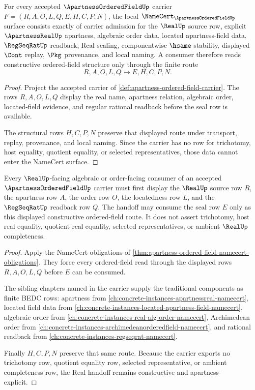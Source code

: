 \begin{theorem}
\label{thm:apartness-ordered-field-namecert-obligations}
For every accepted $\ApartnessOrderedFieldUp$ carrier $F=(R,A,O,L,Q,E,H,C,P,N)$, the local $\NameCert_{\ApartnessOrderedFieldUp}$ surface consists exactly of carrier admission for the $\RealUp$ source row, explicit $\ApartnessRealUp$ apartness, algebraic order data, located apartness-field data, $\RegSeqRatUp$ readback, Real sealing, componentwise $\hsame$ stability, displayed $\Cont$ replay, $\Pkg$ provenance, and local naming. A consumer therefore reads constructive ordered-field structure only through the finite route
$$
R,A,O,L,Q \longmapsto E,H,C,P,N .
$$
\end{theorem}
\begin{proof}
Project the accepted carrier of \autoref{def:apartness-ordered-field-carrier}. The rows $R,A,O,L,Q$ display the real name, apartness relation, algebraic order, located-field evidence, and regular rational readback before the seal row is available.

The structural rows $H,C,P,N$ preserve that displayed route under transport, replay, provenance, and local naming. Since the carrier has no row for trichotomy, host equality, quotient equality, or selected representatives, those data cannot enter the NameCert surface.
\end{proof}

\begin{theorem}
\label{thm:apartness-ordered-field-real-handoff}
Every $\RealUp$-facing algebraic or order-facing consumer of an accepted $\ApartnessOrderedFieldUp$ carrier must first display the $\RealUp$ source row $R$, the apartness row $A$, the order row $O$, the locatedness row $L$, and the $\RegSeqRatUp$ readback row $Q$. The handoff may consume the seal row $E$ only as this displayed constructive ordered-field route. It does not assert trichotomy, host real equality, quotient real equality, selected representatives, or ambient $\RealUp$ completeness.
\end{theorem}
\begin{proof}
Apply the NameCert obligations of \autoref{thm:apartness-ordered-field-namecert-obligations}. They force every ordered-field read through the displayed rows $R,A,O,L,Q$ before $E$ can be consumed.

The sibling chapters named in the carrier supply the traditional components as finite BEDC rows: apartness from \autoref{ch:concrete-instances-apartnessreal-namecert}, located field data from \autoref{ch:concrete-instances-located-apartness-field-namecert}, algebraic order from \autoref{ch:concrete-instances-real-alg-order-namecert}, Archimedean order from \autoref{ch:concrete-instances-archimedeanorderedfield-namecert}, and rational readback from \autoref{ch:concrete-instances-regseqrat-namecert}.

Finally $H,C,P,N$ preserve that same route. Because the carrier exports no trichotomy row, quotient equality row, selected representative, or ambient completeness row, the Real handoff remains constructive and apartness-explicit.
\end{proof}

